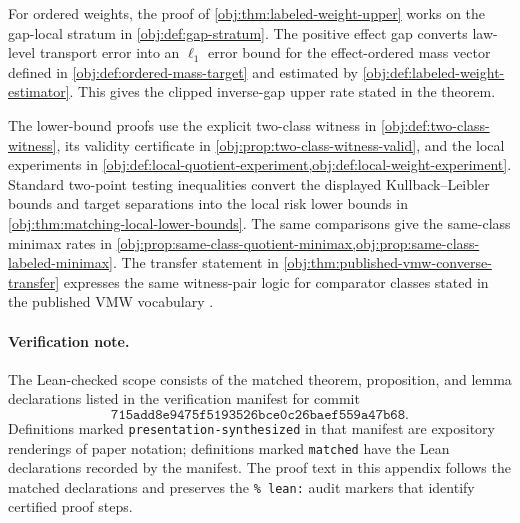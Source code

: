 \documentclass[11pt]{article}
\begin{document}
For ordered weights, the proof of \cref{obj:thm:labeled-weight-upper} works on the gap-local stratum in \cref{obj:def:gap-stratum}. The positive effect gap converts law-level transport error into an \(\ell_1\) error bound for the effect-ordered mass vector defined in \cref{obj:def:ordered-mass-target} and estimated by \cref{obj:def:labeled-weight-estimator}. This gives the clipped inverse-gap upper rate stated in the theorem.

The lower-bound proofs use the explicit two-class witness in \cref{obj:def:two-class-witness}, its validity certificate in \cref{obj:prop:two-class-witness-valid}, and the local experiments in \cref{obj:def:local-quotient-experiment,obj:def:local-weight-experiment}. Standard two-point testing inequalities \citep{LeCam1986,PolyanskiyWu2019} convert the displayed Kullback--Leibler bounds and target separations into the local risk lower bounds in \cref{obj:thm:matching-local-lower-bounds}. The same comparisons give the same-class minimax rates in \cref{obj:prop:same-class-quotient-minimax,obj:prop:same-class-labeled-minimax}. The transfer statement in \cref{obj:thm:published-vmw-converse-transfer} expresses the same witness-pair logic for comparator classes stated in the published VMW vocabulary \citep{VirkMazaheriWu2026}.

\paragraph{Verification note.}
The Lean-checked scope consists of the matched theorem, proposition, and lemma declarations listed in the verification manifest for commit
\[
\texttt{715add8e9475f5193526bce0c26baef559a47b68}.
\]
Definitions marked \texttt{presentation-synthesized} in that manifest are expository renderings of paper notation; definitions marked \texttt{matched} have the Lean declarations recorded by the manifest. The proof text in this appendix follows the matched declarations and preserves the \texttt{\% lean:} audit markers that identify certified proof steps.
\end{document}
